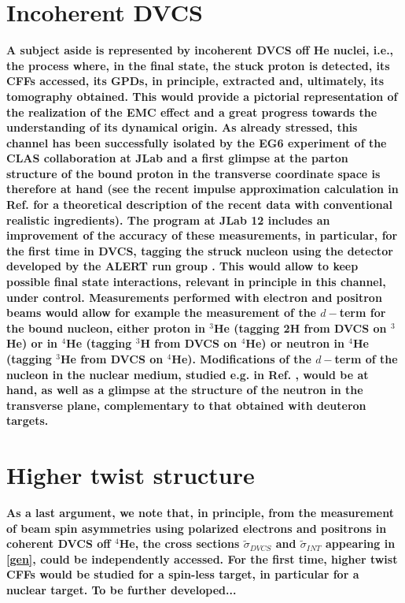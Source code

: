 \documentclass[times, twoside]{PosWhiPap}
\begin{document}
\section*{Incoherent DVCS}
{\bf
A subject aside is represented by incoherent DVCS off He nuclei, i.e.,
the process where, in the final state, the stuck proton is detected, its CFFs accessed, its GPDs, in principle, extracted and, ultimately, its tomography obtained.
This would provide a pictorial representation of the realization of the EMC effect and a great progress towards the understanding of its dynamical origin.
As already stressed, this channel has been successfully isolated by the EG6 experiment of the CLAS collaboration at JLab \cite{Hattawy:2018liu} and a first glimpse at the parton structure of the bound proton in the transverse coordinate space is therefore at hand (see the recent impulse approximation calculation in Ref. \cite{Fucini:2019xlc} for a theoretical description
of the recent data with conventional realistic ingredients).
The program at JLab 12 includes an improvement of the accuracy of these measurements, in particular, for the first time in DVCS, tagging the struck nucleon using the detector
developed by the ALERT run group \cite{Armstrong:2017zcm}.
This would allow to keep possible final state interactions, relevant in principle in this channel, under control.
Measurements performed with 
electron and positron beams  would allow for example the measurement of the $d-$term for the bound nucleon, either proton in $^3$He (tagging 2H from DVCS on $^3$He)  or in $^4$He (tagging $^3$H from 
DVCS on $^4$He) or neutron in $^4$He (tagging $^3$He from DVCS on $^4$He). Modifications 
of the $d-$term of the nucleon in the nuclear medium, studied e.g. in
Ref.
\cite{Jung:2014jja}, would be at hand, as well as a glimpse at the structure of the neutron
in the transverse plane, complementary to that obtained with deuteron targets.}

\section*{Higher twist structure}

{\bf As a last argument,
we note that, in principle, from the measurement of 
beam spin asymmetries using polarized electrons and positrons
in coherent DVCS off $^4$He, the 
cross sections $\tilde 
\sigma_{DVCS}$
and $\tilde 
\sigma_{INT}$
appearing in \eqref{gen},
could be independently accessed.
For the first time, higher twist CFFs would be studied for a spin-less target, in particular for a nuclear target.
To be further developed...
}
\end{document}
